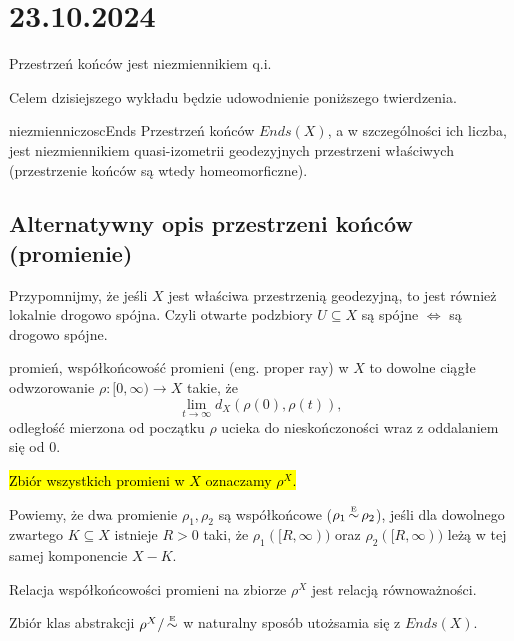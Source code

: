 \section{23.10.2024}{Przestrzeń końców jest niezmiennikiem q.i.}

Celem dzisiejszego wykładu będzie udowodnienie poniższego twierdzenia.

\begin{theorem}{}{niezmienniczoscEnds} 
  Przestrzeń końców $Ends(X)$, a w szczególności ich liczba, jest niezmiennikiem quasi-izometrii geodezyjnych przestrzeni właściwych (przestrzenie końców są wtedy homeomorficzne). %
\end{theorem}

\subsection{Alternatywny opis przestrzeni końców (promienie)}

Przypomnijmy, że jeśli $X$ jest właściwa przestrzenią geodezyjną, to jest również lokalnie drogowo spójna. Czyli otwarte podzbiory $U\subseteq X$ są spójne $\iff$ są drogowo spójne.

\begin{definition}{promień, współkońcowość promieni}{}
   (eng. proper ray) w $X$ to dowolne ciągłe odwzorowanie $\rho:[0,\infty)\to X$ takie, że 
  $$\lim_{t\to\infty}d_X(\rho(0), \rho(t)),$$
  odległość mierzona od początku $\rho$ ucieka do nieskończoności wraz z oddalaniem się od $0$.

  \hl{Zbiór wszystkich promieni w $X$ oznaczamy $\rho^X$.}

  Powiemy, że dwa promienie $\rho_1,\rho_2$ są współkońcowe ($\rho_1\operatorname{\overset{{\scriptscriptstyle E}}{\sim}}\rho_2$), jeśli dla dowolnego zwartego $K\subseteq X$ istnieje $R>0$ taki, że $\rho_1([R, \infty))$ oraz $\rho_2([R, \infty))$ leżą w tej samej komponencie $X-K$.
\end{definition}

Relacja współkońcowości promieni na zbiorze $\rho^X$ jest relacją równoważności.

\begin{fact}{}{}
  Zbiór klas abstrakcji $\rho^X/\operatorname{\overset{{\scriptscriptstyle E}}{\sim}}$ w naturalny sposób utożsamia się z $Ends(X)$.
\end{fact}

